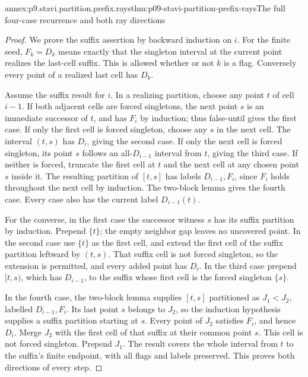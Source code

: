 \begin{annexitem}{annex:p9.stavi.partition.prefix.rays}{thm:p09-stavi-partition-prefix-rays}{The full four-case recurrence and both ray directions}
\begin{proof}
We prove the suffix assertion by backward induction
on \(i\). For the finite seed, \(F_k=D_k\)
means exactly that the singleton interval at the
current point realizes the last-cell suffix.
This is allowed whether or not \(k\) is a flag.
Conversely every point of a realized last cell
has \(D_k\).

Assume the suffix result for \(i\).
In a realizing partition, choose any point
\(t\) of cell \(i-1\). If both adjacent
cells are forced singletons, the next
point \(s\) is an immediate successor
of \(t\), and has \(F_i\) by induction;
thus false-until gives the first case.
If only the first cell is forced
singleton, choose any \(s\) in the
next cell. The interval \((t,s)\)
has \(D_i\), giving the second case.
If only the next cell is forced
singleton, its point \(s\) follows
an all-\(D_{i-1}\) interval from
\(t\), giving the third case.
If neither is forced, truncate the
first cell at \(t\) and the next
cell at any chosen point \(s\)
inside it. The resulting partition
of \([t,s]\) has labels
\(D_{i-1},F_i\), since \(F_i\)
holds throughout the next cell
by induction. The two-block lemma
gives the fourth case.
Every case also has the current
label \(D_{i-1}(t)\).

For the converse, in the first
case the successor witness \(s\)
has its suffix partition by
induction. Prepend \(\{t\}\);
the empty neighbor gap leaves
no uncovered point.
In the second case use
\(\{t\}\) as the first cell,
and extend the first cell of
the suffix partition leftward
by \((t,s)\). That suffix
cell is not forced singleton,
so the extension is permitted,
and every added point has
\(D_i\).
In the third case prepend
\([t,s)\), which has
\(D_{i-1}\), to the suffix
whose first cell is the
forced singleton \(\{s\}\).

In the fourth case, the
two-block lemma supplies
\([t,s]\) partitioned as
\(J_1<J_2\), labelled
\(D_{i-1},F_i\).
Its last point \(s\)
belongs to \(J_2\), so
the induction hypothesis
supplies a suffix partition
starting at \(s\).
Every point of \(J_2\)
satisfies \(F_i\), and
hence \(D_i\).
Merge \(J_2\) with the
first cell of that
suffix at their common
point \(s\). This
cell is not forced
singleton. Prepend
\(J_1\). The result
covers the whole
interval from \(t\)
to the suffix's
finite endpoint,
with all flags
and labels preserved.
This proves both
directions of every
step.


\end{proof}
\end{annexitem}
